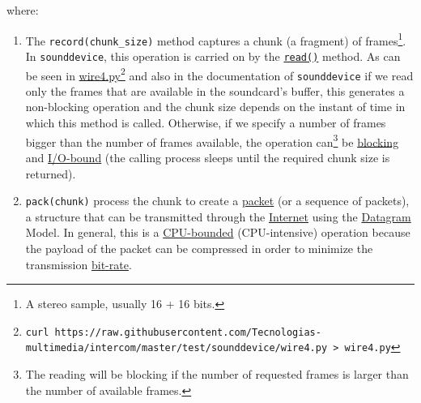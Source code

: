 
where:

\begin{enumerate}
\item The \verb|record(chunk_size)| method captures a chunk (a
  fragment) of frames\footnote{A stereo sample, usually 16 + 16
    bits.}. In \verb|sounddevice|, this operation is carried on by the
  \href{https://python-sounddevice.readthedocs.io/en/0.4.0/api/streams.html#sounddevice.Stream.read}{\texttt{read()}}
    method. As can be seen in
  \href{https://raw.githubusercontent.com/Tecnologias-multimedia/intercom/master/test/sounddevice/wire4.py}{wire4.py}\footnote{
    \texttt{curl
      https://raw.githubusercontent.com/Tecnologias-multimedia/intercom/master/test/sounddevice/wire4.py
      > wire4.py}} and also in the documentation of
  \verb|sounddevice| if we read only the frames that are available in
  the soundcard's buffer, this generates a non-blocking operation and
  the chunk size depends on the instant of time in which this method
  is called. Otherwise, if we specify a number of frames bigger than
  the number of frames available, the operation can\footnote{The
    reading will be blocking if the number of requested frames is
    larger than the number of available frames.} be
  \href{https://python-sounddevice.readthedocs.io/en/0.4.0/api/streams.html#sounddevice.Stream.write}{blocking}
  and \href{https://en.wikipedia.org/wiki/I/O_bound}{I/O-bound} (the
  calling process sleeps until the required chunk size is returned).

\item \verb|pack(chunk)| process the chunk to create a
  \href{https://en.wikipedia.org/wiki/Network_packet}{packet} (or a
  sequence of packets), a structure that can be transmitted through
  the \href{https://en.wikipedia.org/wiki/Internet}{Internet} using the
  \href{https://en.wikipedia.org/wiki/Datagram}{Datagram} Model. In
  general, this is a
  \href{https://en.wikipedia.org/wiki/CPU-bound}{CPU-bounded}
  (CPU-intensive) operation because the payload of the packet can be
  compressed in order to minimize the transmission
  \href{https://en.wikipedia.org/wiki/Bit_rate}{bit-rate}.


\end{enumerate}
